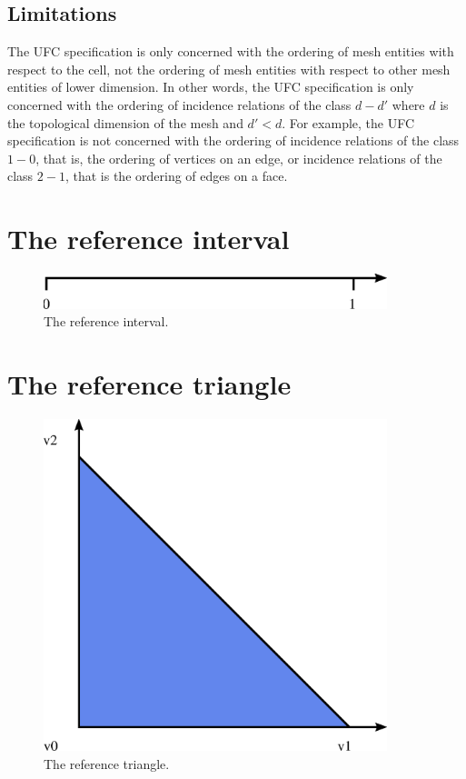\subsection{Limitations}

The UFC specification is only concerned with the ordering of mesh
entities with respect to the cell, not the ordering of mesh entities
with respect to other mesh entities of lower dimension. In other
words, the UFC specification is only concerned with the ordering of
incidence relations of the class $d - d'$ where $d$ is the
topological dimension of the mesh and $d' < d$. For example, the UFC
specification is not concerned with the ordering of incidence
relations of the class $1 - 0$, that is, the ordering of vertices on
an edge, or incidence relations of the class $2 - 1$, that is the
ordering of edges on a face.

\newpage
\section{The reference interval}

\begin{figure}[H]
  \begin{center}
    \includegraphics[width=10cm]{eps/interval.eps}
    \caption{The reference interval.}
  \end{center}
\end{figure}

\newpage
\section{The reference triangle}

\begin{figure}[H]
  \begin{center}
    \includegraphics[width=10cm]{eps/triangle.eps}
    \caption{The reference triangle.}
  \end{center}
\end{figure}

